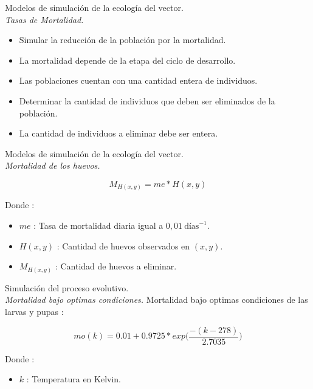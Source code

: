 \begin{frame}[c]{Modelos de simulación de la ecología del vector.\\\textit{Tasas de Mortalidad.}}
  \begin{itemize}
      \item Simular la reducción de la población por la mortalidad.
      \item La mortalidad depende de la etapa del ciclo de desarrollo.
      \item Las poblaciones cuentan con una cantidad entera de individuos.
      \item Determinar la cantidad de individuos que deben ser eliminados de la población.
      \item La cantidad de individuos a eliminar debe ser entera.
  \end{itemize}
\end{frame}

\begin{frame}[c]{Modelos de simulación de la ecología del vector.\\\textit{Mortalidad de los huevos.}}
  \begin{center}
      \begin{equation}
          M_{H(x,y)} = me * H(x,y)
      \end{equation}
  \end{center}
  Donde :
    \begin{itemize}
      \item $me$ : Tasa de mortalidad diaria igual a $0,01\  \text{días}^{-1}$.
      \item $H(x, y)$ : Cantidad de huevos observados en $(x,y)$.
      \item $M_{H(x,y)}$ : Cantidad de huevos a eliminar.
    \end{itemize}
\end{frame}

\begin{frame}[c]{Simulación del proceso evolutivo. \\\textit{Mortalidad bajo optimas condiciones.}}
  Mortalidad bajo optimas condiciones de las larvas y pupas :
  \begin{center}
    \begin{equation}
    \label{eq:mortalidad-natural-larvas}
        mo(k) = 0.01 + 0.9725 * exp\bigg( \frac{-(k - 278)}{2.7035}\bigg)
    \end{equation}
  \end{center}
  Donde :
    \begin{itemize}
      \item $k$ : Temperatura en Kelvin.
    \end{itemize}
\end{frame}

